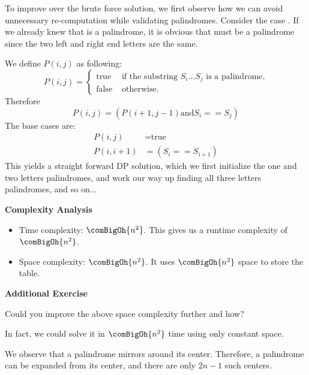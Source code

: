 

To improve over the brute force solution, we first observe how we can avoid
unnecessary re-computation while validating palindromes. Consider the case
. If we already knew that  is a palindrome, it is
obvious that  must be a palindrome since the two left and right
end letters are the same.

We define $P(i,j)$ as following:
\begin{equation*}
P(i,j)=
\begin{cases}
\text{true} &\text{ if the substring $S_i\ldots S_j$ is a palindrome,}\\
\text{false}&\text{ otherwise.}
\end{cases}
\end{equation*}
Therefore
\begin{equation*}
P(i,j)=(P(i+1,j-1) \text{and} S_i==S_j)
\end{equation*}
The base cases are:
\begin{align*}
P(i,j) &= \text{true}\\
P(i,i+1)&= (S_i == S_{i+1})
\end{align*}
This yields a straight forward DP solution, which we first initialize the
one and two letters palindromes, and work our way up finding all three
letters palindromes, and so on...

\noindent{}\textbf{Complexity Analysis}
\begin{itemize}[noitemsep,topsep=0pt]
\item Time complexity: $\comBigOh{n^2}$. This gives us a runtime complexity
  of $\comBigOh{n^2}$.
\item Space complexity: $\comBigOh{n^2}$. It uses $\comBigOh{n^2}$ space to
  store the table.
\end{itemize}

\noindent{}\textbf{Additional Exercise}

Could you improve the above space complexity further and how?


In fact, we could solve it in $\comBigOh{n^2}$ time using only constant
space.

We observe that a palindrome mirrors around its center. Therefore, a
palindrome can be expanded from its center, and there are only $2n-1$ such
centers.

